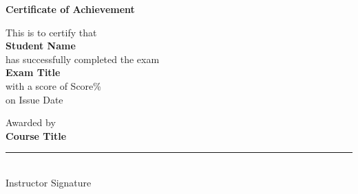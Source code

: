 ﻿\documentclass[a4paper,12pt]{article}
\begin{document}
\begin{center}
    \vspace*{2cm}
    \Large \textbf{Certificate of Achievement} \\
    \vspace{1cm}

    \large This is to certify that \\
    \vspace{0.5cm}
    \textbf{Student Name} \\
    \vspace{0.5cm}
    has successfully completed the exam \\
    \textbf{Exam Title} \\
    with a score of Score\% \\
    on Issue Date \\
    \vspace{1cm}

    \large Awarded by \\
    \textbf{Course Title} \\
    \vspace{1cm}

    \rule{0.3\textwidth}{0.5pt} \\
    \small Instructor Signature
\end{center}
\end{document}
